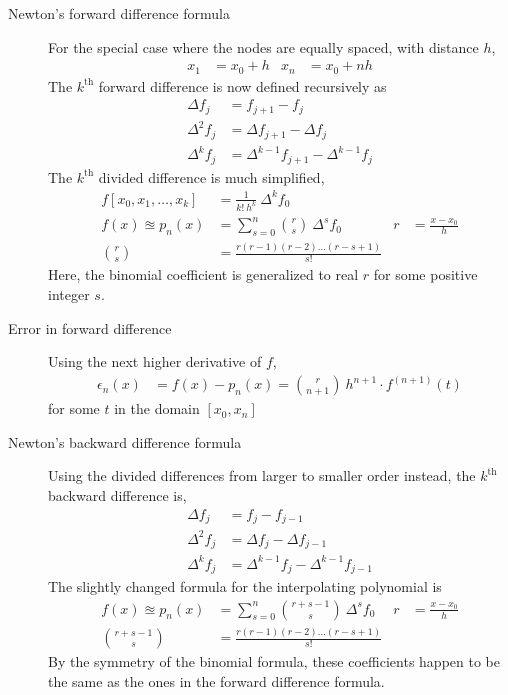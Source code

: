 \begin{description}
    \item[Newton's forward difference formula] For the special case where the nodes are
        equally spaced, with distance $ h $,
        \begin{align}
            x_1 & = x_0 + h & x_n & = x_0 + nh
        \end{align}
        The $ k^{\text{th}} $ forward difference is now defined recursively as
        \begin{align}
            \Delta f_j   & = f_{j+1} - f_j                           \\
            \Delta^2 f_j & = \Delta f_{j+1} - \Delta f_j             \\
            \Delta^k f_j & = \Delta^{k-1} f_{j+1} - \Delta^{k-1} f_j
        \end{align}
        The $ k^{\text{th}} $ divided difference is much simplified,
        \begin{align}
            f[x_0,x_1,\dots,x_k]  & = \frac{1}{k!\ h^k}\ \Delta^k f_0                \\
            f(x) \approxeq p_n(x) & = \sum_{s = 0}^{n} \binom{r}{s} \ \Delta^s f_0 &
            r                     & = \frac{x - x_0}{h}                              \\
            \binom{r}{s}          & = \frac{r(r-1)(r-2)\dots(r-s+1)}{s!}
        \end{align}
        Here, the binomial coefficient is generalized to real $ r $ for some positive
        integer $ s $.

    \item[Error in forward difference] Using the next higher derivative of $ f $,
        \begin{align}
            \epsilon_n(x) & = f(x) - p_n(x) = \binom{r}{n+1}\ h^{n+1} \cdot f^{(n+1)}(t)
        \end{align}
        for some $ t $ in the domain $ [x_0, x_n] $

    \item[Newton's backward difference formula] Using the divided differences from
        larger to smaller order instead, the $ k^{\text{th}} $ backward difference is,
        \begin{align}
            \Delta f_j   & = f_j - f_{j-1}                           \\
            \Delta^2 f_j & = \Delta f_{j} - \Delta f_{j-1}           \\
            \Delta^k f_j & = \Delta^{k-1} f_j - \Delta^{k-1} f_{j-1}
        \end{align}
        The slightly changed formula for the interpolating polynomial is
        \begin{align}
            f(x) \approxeq p_n(x) & = \sum_{s = 0}^{n} \binom{r+s-1}{s}
            \ \Delta^s f_0        &
            r                     & = \frac{x - x_0}{h}                  \\
            \binom{r+s-1}{s}      & = \frac{r(r-1)(r-2)\dots(r-s+1)}{s!}
        \end{align}
        By the symmetry of the binomial formula, these coefficients happen to be the same
        as the ones in the forward difference formula.


\end{description}
